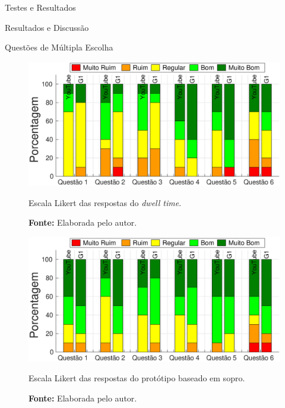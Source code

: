 \begin{chapter}{Testes e Resultados}
\begin{section}{Resultados e Discussão}
\begin{subsection}{Questões de Múltipla Escolha}
\begin{figure}[!h]
	\centering
	\begin{minipage}[c]{\textwidth}
	\centering
	\includegraphics[width=0.95\linewidth]{fig/DwellQuestions}
	\vspace{-0.5cm}
	\caption{Escala Likert das respostas do \textit{dwell time}.} 
	\vspace{-1cm}
	\caption*{\textbf{Fonte: }Elaborada pelo autor.}
	\label{fig:DwellQuestions}
	\end{minipage}
\end{figure}

\begin{figure}[!h]
	\centering
	\begin{minipage}[c]{\textwidth}
	\centering
	\includegraphics[width=0.95\linewidth]{fig/PuffQuestions}
	\vspace{-0.5cm}
	\caption{Escala Likert das respostas do protótipo baseado em sopro.}
	\vspace{-1cm}
	\caption*{\textbf{Fonte: }Elaborada pelo autor.}
	\label{fig:PuffQuestions}
	\end{minipage}
\end{figure}




\end{subsection}
\end{section}
\end{chapter}
